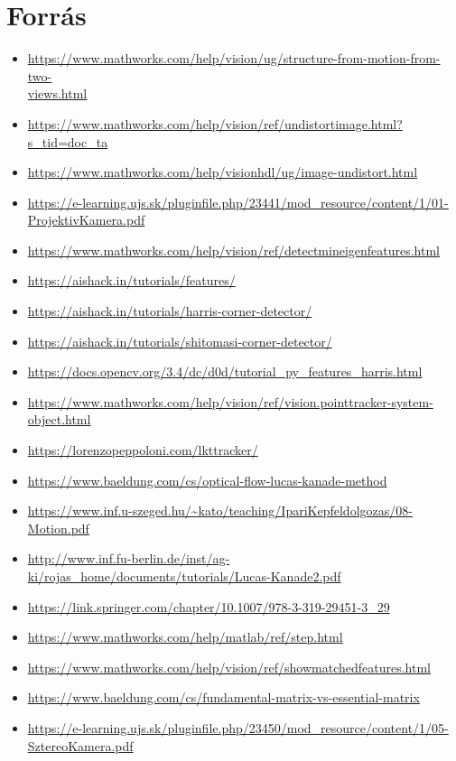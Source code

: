 \documentclass[12pt]{report}
\begin{document}
    \chapter{Forrás}
        \begin{itemize}
            \item \url{https://www.mathworks.com/help/vision/ug/structure-from-motion-from-two-}\\\url{views.html}
            \item \url{https://www.mathworks.com/help/vision/ref/undistortimage.html?s_tid=doc_ta}
            \item \url{https://www.mathworks.com/help/visionhdl/ug/image-undistort.html}
            \item \url{https://e-learning.ujs.sk/pluginfile.php/23441/mod_resource/content/1/01-ProjektivKamera.pdf}
            \item \url{https://www.mathworks.com/help/vision/ref/detectmineigenfeatures.html}
            \item \url{https://aishack.in/tutorials/features/}
            \item \url{https://aishack.in/tutorials/harris-corner-detector/}
            \item \url{https://aishack.in/tutorials/shitomasi-corner-detector/}
            \item \url{https://docs.opencv.org/3.4/dc/d0d/tutorial_py_features_harris.html}
            \item \url{https://www.mathworks.com/help/vision/ref/vision.pointtracker-system-object.html}
            \item \url{https://lorenzopeppoloni.com/lkttracker/}
            \item \url{https://www.baeldung.com/cs/optical-flow-lucas-kanade-method}
            \item \url{https://www.inf.u-szeged.hu/~kato/teaching/IpariKepfeldolgozas/08-Motion.pdf}
            \item \url{http://www.inf.fu-berlin.de/inst/ag-ki/rojas_home/documents/tutorials/Lucas-Kanade2.pdf}
            \item \url{https://link.springer.com/chapter/10.1007/978-3-319-29451-3_29}
            \item \url{https://www.mathworks.com/help/matlab/ref/step.html}
            \item \url{https://www.mathworks.com/help/vision/ref/showmatchedfeatures.html}
            \item \url{https://www.baeldung.com/cs/fundamental-matrix-vs-essential-matrix}
            \item \url{https://e-learning.ujs.sk/pluginfile.php/23450/mod_resource/content/1/05-SztereoKamera.pdf}
        \end{itemize}
\end{document}

